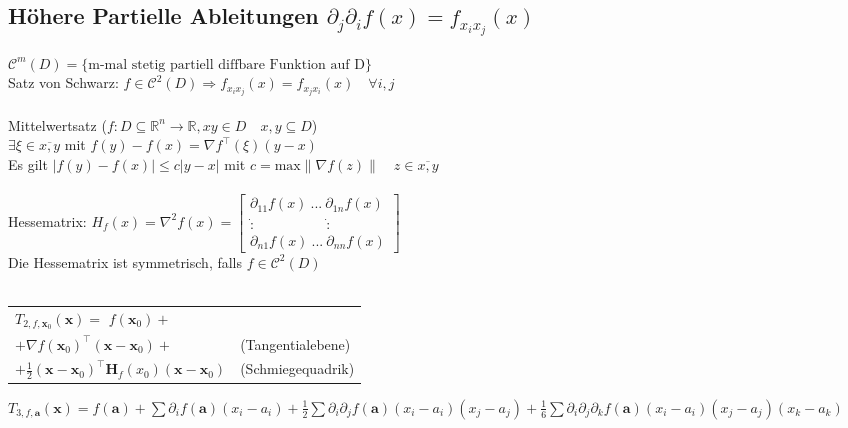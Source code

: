 \documentclass[6pt,a4paper]{scrartcl}
\let\olddot = \dot
\newcommand{\eset}[1]{\ensuremath{\bigl\{#1\bigr\}}}                                            %
\newcommand{\norm}[1]{\ensuremath{\|#1\|}}                                                      %
\newcommand{\ma}[1]{\ensuremath{\boldsymbol {#1}}}                                              %
\newcommand{\svdots}{\ensuremath{\olddot :}}                                                    %
\renewcommand{\vec}[1]{\ensuremath{\boldsymbol {#1}}}                                           %
\renewcommand*{\dot}[1]{\accentset{\mbox{\textrm{\large\bfseries .}} }{#1}}                     %
\begin{document}
\begin{multicols*}{4}
    \subsection{Höhere Partielle Ableitungen $\partial_j \partial_i f(x) = f_{x_i x_j} (x)$}
    $\mathcal C^m (D) = \eset{\text{m-mal stetig partiell diffbare Funktion auf D}}$\\
    Satz von Schwarz: $f \in \mathcal C^2 (D) \Rightarrow f_{x_i x_j} (x)= f_{x_j x_i} (x) \quad \forall i,j$\\
    \\
    Mittelwertsatz ($f:D\subseteq \mathbb R^n \rightarrow \mathbb R, xy \in D \quad x,y \subseteq D$)\\
    $\exists \xi \in \overline{x,y}$ mit $f(y)-f(x)=\nabla f^\top (\xi)(y-x)$\\
    Es gilt $|f(y) - f(x)| \le c|y-x|$ mit $c= \mathrm{max} \norm{\nabla f(z)} \quad z \in \overline{x,y}$\\
    \\
    Hessematrix: $H_f (x) = \nabla^2 f(x) = \begin{bmatrix} \partial_{11} f(x)\ ...\ \partial_{1n} f(x) \\ \svdots \quad \qquad \qquad \svdots \\ \partial_{n1} f(x)\ ...\ \partial_{nn} f(x) \end{bmatrix}$\\
    Die Hessematrix ist symmetrisch, falls $f \in \mathcal C^2(D)$\\
    \\
    \begin{tabular}{ll}
        $T_{2,f, \vec x_0} (\vec x) =$ $f(\vec x_0) +$                                                  \\
        \qquad $+ \nabla f(\vec x_0)^\top (\vec x-\vec x_0) +$                      & (Tangentialebene) \\
        \qquad $+ \frac{1}{2}(\vec x-\vec x_0)^\top \ma H_f(x_0)(\vec x- \vec x_0)$ & (Schmiegequadrik) \\
    \end{tabular}

    $T_{3,f,\vec a}(\vec x) = f(\vec a) + \sum \partial_i f(\vec a)(x_i - a_i) + \frac{1}{2} \sum \partial_i \partial_j f(\vec a)(x_i - a_i)(x_j - a_j) + \frac{1}{6} \sum \partial_i \partial_j \partial_k f(\vec a)(x_i - a_i)(x_j - a_j)(x_k - a_k)$


\end{multicols*}
\end{document}
